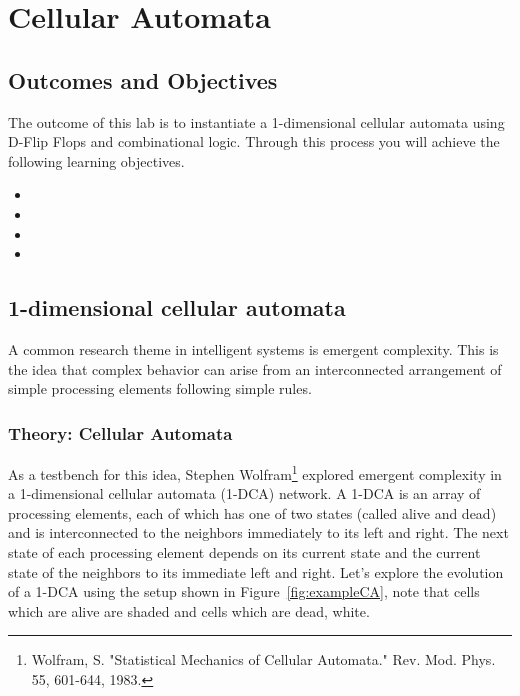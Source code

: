 \chapter{Cellular Automata}
\label{chapter:cellAuto}
\graphicspath{ {./Lab07CellularAutomata/Fig} }

\section{Outcomes and Objectives}

The outcome of this lab is to instantiate a 1-dimensional 
cellular automata using D-Flip Flops and combinational logic.
Through this process you will achieve the following
learning objectives.
\begin{itemize}
	\item {}
	\item {}	
	\item {}
	\item {}			
\end{itemize}



\section{1-dimensional cellular automata}

A common research theme in intelligent systems is emergent complexity.
This is the idea that complex behavior can arise from an interconnected
arrangement of simple processing elements following simple rules. 

\subsection{Theory: Cellular Automata}
As a testbench for this idea, Stephen Wolfram\footnote{Wolfram, S.
  "Statistical Mechanics of Cellular Automata." Rev. Mod. Phys. 55,
  601-644, 1983.} explored emergent complexity in a 1-dimensional
cellular automata (1-DCA) network. A 1-DCA is an array of processing
elements, each of which has one of two states (called alive and dead)
and is interconnected to the neighbors immediately to its left and
right. The next state of each processing element depends on its current
state and the current state of the neighbors to its immediate left and
right. Let's explore the evolution of a 1-DCA using the setup shown in
Figure~\ref{fig:exampleCA}, note that cells which are alive are shaded and cells which are
dead, white.


